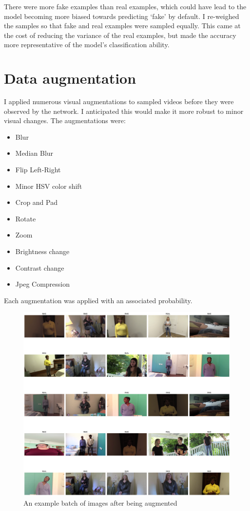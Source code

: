 \documentclass[12pt,letterpaper]{hmcpset}
\begin{document}
There were more fake examples than real examples, which could have lead to the model becoming more biased towards predicting `fake' by default.
I re-weighed the samples so that fake and real examples were sampled equally.
This came at the cost of reducing the variance of the real examples, but made the accuracy more representative of the model's classification ability.

\section{Data augmentation}
I applied numerous visual augmentations to sampled videos before they were observed by the network.
I anticipated this would make it more robust to minor visual changes.
The augmentations were:

\begin{itemize}
    \item Blur
    \item Median Blur
    \item Flip Left-Right
    \item Minor HSV color shift
    \item Crop and Pad
    \item Rotate
    \item Zoom
    \item Brightness change
    \item Contrast change
    \item Jpeg Compression
\end{itemize}
Each augmentation was applied with an associated probability.

\begin{figure}
    \centering
    \includegraphics[width=\textwidth]{transformed}
    \caption{An example batch of images after being augmented}
\end{figure}
\end{document}

